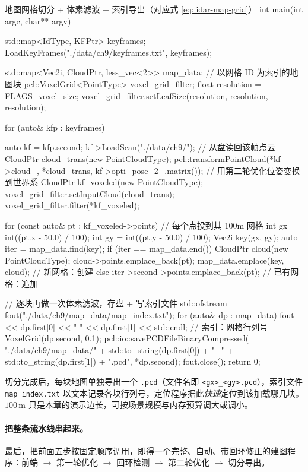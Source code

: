 \begin{codebox}[C++]{地图网格切分 + 体素滤波 + 索引导出（对应式 \ref{eq:lidar-map-grid}）}
int main(int argc, char** argv) {
  std::map<IdType, KFPtr> keyframes;
  LoadKeyFrames("./data/ch9/keyframes.txt", keyframes);

  std::map<Vec2i, CloudPtr, less_vec<2>> map_data;   // 以网格 ID 为索引的地图块
  pcl::VoxelGrid<PointType> voxel_grid_filter;
  float resolution = FLAGS_voxel_size;
  voxel_grid_filter.setLeafSize(resolution, resolution, resolution);

  for (auto& kfp : keyframes) {
    auto kf = kfp.second;
    kf->LoadScan("./data/ch9/");                      // 从盘读回该帧点云
    CloudPtr cloud_trans(new PointCloudType);
    pcl::transformPointCloud(*kf->cloud_, *cloud_trans,
                             kf->opti_pose_2_.matrix());   // 用第二轮优化位姿变换到世界系
    CloudPtr kf_voxeled(new PointCloudType);
    voxel_grid_filter.setInputCloud(cloud_trans);
    voxel_grid_filter.filter(*kf_voxeled);

    for (const auto& pt : kf_voxeled->points) {       // 每个点投到其 100m 网格
      int gx = int((pt.x - 50.0) / 100);
      int gy = int((pt.y - 50.0) / 100);
      Vec2i key(gx, gy);
      auto iter = map_data.find(key);
      if (iter == map_data.end()) {
        CloudPtr cloud(new PointCloudType);
        cloud->points.emplace_back(pt);
        map_data.emplace(key, cloud);                 // 新网格：创建
      } else {
        iter->second->points.emplace_back(pt);        // 已有网格：追加
      }
    }
  }

  // 逐块再做一次体素滤波，存盘 + 写索引文件
  std::ofstream fout("./data/ch9/map_data/map_index.txt");
  for (auto& dp : map_data) {
    fout << dp.first[0] << " " << dp.first[1] << std::endl; // 索引：网格行列号
    VoxelGrid(dp.second, 0.1);
    pcl::io::savePCDFileBinaryCompressed(
        "./data/ch9/map_data/" + std::to_string(dp.first[0]) + "_"
        + std::to_string(dp.first[1]) + ".pcd", *dp.second);
  }
  fout.close();
  return 0;
}
\end{codebox}

切分完成后，每块地图单独导出一个 \texttt{.pcd}（文件名即 \texttt{<gx>\_<gy>.pcd}），索引文件 \texttt{map\_index.txt} 以文本记录各块行列号，定位程序据此\emph{快速}定位到该加载哪几块。$100$\,m 只是本章的演示边长，可按场景规模与内存预算调大或调小。

\paragraph{把整条流水线串起来。}
最后，把前面五步按固定顺序调用，即得一个完整、自动、带回环修正的建图程序\cite{gao2023slamad}：前端 $\to$ 第一轮优化 $\to$ 回环检测 $\to$ 第二轮优化 $\to$ 切分导出。

